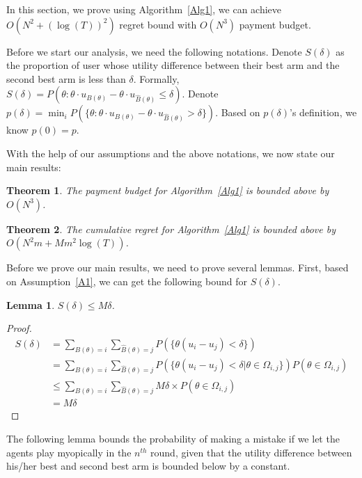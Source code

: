 \documentclass{article}
\newtheorem{theorem}{Theorem}
\newtheorem{lemma}{Lemma}
\begin{document}
In this section, we prove using Algorithm~\ref{Alg1}, we can achieve $O(N^2+(\log(T))^2)$ regret bound with $O(N^3)$ payment budget.

Before we start our analysis, we need the following notations. Denote $S(\delta)$ as the proportion of user whose utility difference between their best arm and the second best arm is less than $\delta$. Formally, $S(\delta)=P(\theta: \theta \cdot u_{B(\theta)}-\theta\cdot u_{\hat{B}(\theta)}\leq \delta)$. Denote $p(\delta)=\min_{i}P(\{\theta:\theta\cdot u_{B(\theta)}-\theta\cdot u_{\hat{B}(\theta)}>\delta\})$. Based on $p(\delta)$'s definition, we know $p(0)=p$. 

With the help of our assumptions and the above notations, we now state our main results:

\begin{theorem}
The payment budget for Algorithm~\ref{Alg1} is bounded above by $O(N^3)$.
\label{rst:budget}
\end{theorem}


\begin{theorem}
The cumulative regret for Algorithm~\ref{Alg1} is bounded above by $O(N^2 m + M m^2\log(T))$.
\label{rst:regret}
\end{theorem}

Before we prove our main results, we need to prove several lemmas. First, based on Assumption~\ref{A1}, we can get the following bound for $S(\delta)$.

\begin{lemma}
$S(\delta)\leq M\delta$.
\label{lemma:sdelta}
\end{lemma}

\begin{proof}
\begin{align}
S(\delta)&=\sum_{B(\theta)=i}\sum_{\hat{B}(\theta)=j}P(\{\theta(u_{i}-u_{j})<\delta\}) \nonumber \\
&=\sum_{B(\theta)=i}\sum_{\hat{B}(\theta)=j}P(\{\theta(u_{i}-u_{j})<\delta|\theta\in \Omega_{i,j}\})P(\theta\in \Omega_{i,j}) \nonumber \\
&\leq \sum_{B(\theta)=i}\sum_{\hat{B}(\theta)=j}M\delta \times P(\theta\in \Omega_{i,j}) \nonumber \\
&=M\delta \nonumber 
\end{align}
\end{proof}

The following lemma bounds the probability of making a mistake if we let the agents play myopically in the $n^{th}$ round, given that the utility difference between his/her best and second best arm is bounded below by a constant.
\end{document}
